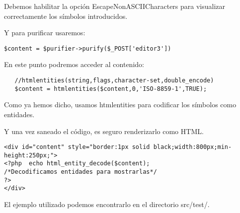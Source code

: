Debemos habilitar la opción EscapeNonASCIICharacters para visualizar correctamente los símbolos introducidos.


Y para purificar usaremos:

\begin{verbatim}
$content = $purifier->purify($_POST['editor3'])
\end{verbatim}


En este punto podremos acceder al contenido:

\begin{verbatim}
   //htmlentities(string,flags,character-set,double_encode)
   $content = htmlentities($content,0,'ISO-8859-1',TRUE);
\end{verbatim}

Como ya hemos dicho, usamos htmlentities para codificar los símbolos como entidades.

Y una vez saneado el código, es seguro renderizarlo como HTML.

\begin{verbatim}
<div id="content" style="border:1px solid black;width:800px;min-height:250px;">
<?php  echo html_entity_decode($content);
/*Decodificamos entidades para mostrarlas*/
?>
</div>
\end{verbatim}


El ejemplo utilizado podemos encontrarlo en el directorio src/test/.

